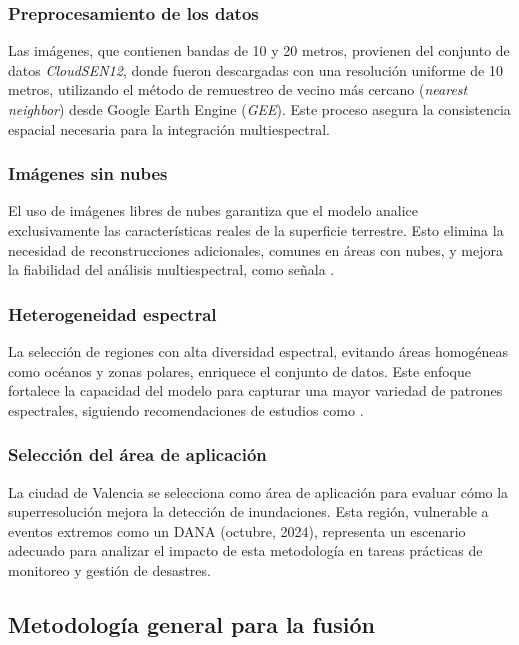         \subsubsection{Preprocesamiento de los datos}

            Las imágenes, que contienen bandas de 10 y 20 metros, provienen del conjunto de datos \textit{CloudSEN12}, donde fueron descargadas con una resolución uniforme de 10 metros, utilizando el método de remuestreo de vecino más cercano (\textit{nearest neighbor}) desde Google Earth Engine (\textit{GEE}). Este proceso asegura la consistencia espacial necesaria para la integración multiespectral.

        \subsubsection{Imágenes sin nubes}

            El uso de imágenes libres de nubes garantiza que el modelo analice exclusivamente las características reales de la superficie terrestre. Esto elimina la necesidad de reconstrucciones adicionales, comunes en áreas con nubes, y mejora la fiabilidad del análisis multiespectral, como señala \textcite{li2023transformer}.

        \subsubsection{Heterogeneidad espectral}

            La selección de regiones con alta diversidad espectral, evitando áreas homogéneas como océanos y zonas polares, enriquece el conjunto de datos. Este enfoque fortalece la capacidad del modelo para capturar una mayor variedad de patrones espectrales, siguiendo recomendaciones de estudios como \textcite{jiao2023integrated}.

        \subsubsection{Selección del área de aplicación}

            La ciudad de Valencia se selecciona como área de aplicación para evaluar cómo la superresolución mejora la detección de inundaciones. Esta región, vulnerable a eventos extremos como un DANA (octubre, 2024), representa un escenario adecuado para analizar el impacto de esta metodología en tareas prácticas de monitoreo y gestión de desastres.


    \subsection{Metodología general para la fusión}

